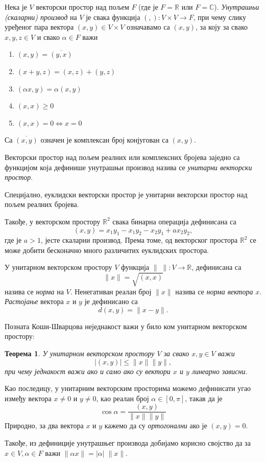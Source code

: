 \documentclass{report}
\theoremstyle{plain}
\newtheorem{thm}{Теорема}
\theoremstyle{definition}
\begin{document}
Нека је $V$ векторски простор над пољем $F$ (где је $F=\mathbb{R}$ или $F=\mathbb{C}$). \emph{Унутрашњи (скаларни) производ} на $V$ је свака функција $(,):V\times V\to F$, при чему слику уређеног пара вектора $(x, y)\in V\times V$ означавамо са $(x, y)$, за коју за свако $x, y, z\in V$ и свако $\alpha \in F$ важи
\begin{enumerate}
  \item $(x, y) = \overline{(y, x)}$
  \item $(x+y, z) = (x, z)+(y, z)$
  \item $(\alpha x, y) = \alpha (x, y)$
  \item $(x, x)\geq 0$
  \item $(x, x) = 0 \Leftrightarrow x=0$
\end{enumerate}
Са $\overline{(x, y)}$ означен је комплексан број конјугован са $(x, y)$.

Векторски простор над пољем реалних или комплексних бројева заједно са функцијом која дефинише унутрашњи производ назива се \emph{унитарни векторски простор}.

Специјално, еуклидски векторски простор је унитарни векторски простор над пољем реалних бројева.

Такође, у векторском простору $\mathbb{R}^2$ свака бинарна операција дефинисана са
$$(x, y) = x_1y_1 - x_1y_2 - x_2y_1 +ax_2y_2,$$
где је $a>1$, јесте скаларни производ. Према томе, од векторског простора $\mathbb{R}^2$ се може добити бесконачно много различитих еуклидских простора.

У унитарном векторском простору $V$ функција $\|\;\|:V\to \mathbb{R}$, дефинисана са $$\|x\| = \sqrt{(x, x)}$$ назива се \emph{норма} на $V$. Ненегативан реалан број $\|x\|$ назива се \emph{норма вектора} $x$.
\emph{Растојање} вектора $x$ и $y$ је дефинисано са $$d(x, y) = \|x-y\|.$$

Позната Коши-Шварцова неједнакост важи у било ком унитарном векторском простору:
\begin{thm}
У унитарном векторском простору $V$ за свако $x, y\in V$ важи
$$|(x, y)|\leq\|x\|\|y\|,$$
при чему једнакост важи ако и само ако су вектори $x$ и $y$ линеарно зависни.
\end{thm}
Као последицу, у унитарним векторским просторима можемо дефинисати угао између вектора $x\neq 0$ и $y\neq 0$, као реалан број $\alpha\in [0, \pi]$, такав да је $$\cos \alpha = \frac{(x, y)}{\|x\|\|y\|}$$
Природно, за два вектора $x$ и $y$ кажемо да су \emph{ортогонални} ако је $(x, y) = 0$.

Такође, из дефиниције унутрашњег производа добијамо корисно својство да за $x\in V, \alpha \in F$ важи $\|\alpha x\| = |\alpha|\; \|x\|$.
\end{document}

